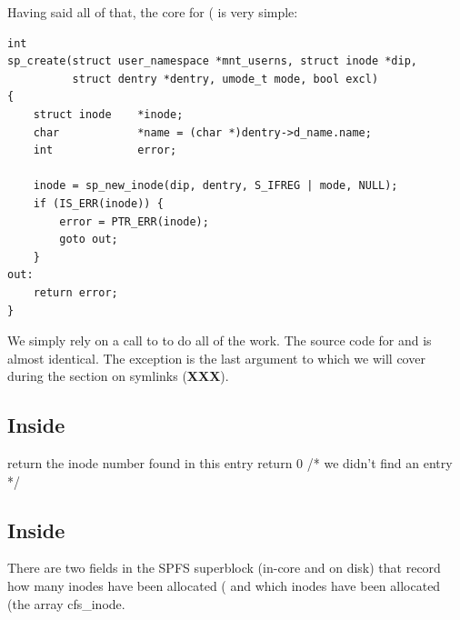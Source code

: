 \noindent
Having said all of that, the core for ( is very simple:

\begin{lstlisting}
int
sp_create(struct user_namespace *mnt_userns, struct inode *dip,
          struct dentry *dentry, umode_t mode, bool excl)
{ 
    struct inode    *inode;
    char            *name = (char *)dentry->d_name.name;
    int             error;
			
    inode = sp_new_inode(dip, dentry, S_IFREG | mode, NULL);
    if (IS_ERR(inode)) {
        error = PTR_ERR(inode);
        goto out;
    }
out:        
	return error;
}
\end{lstlisting}

\noindent
We simply rely on a call to  to do all of the work. The source code for  and  is almost identical. The exception is the last argument to  which we will cover during the section on symlinks (\textbf{XXX}).


\subsection{Inside }

\noindent
\begin{algorithmic}
\State return the inode number found in this entry
\EndIf
\EndFor
\EndFor
\State return 0 /* we didn't find an entry */
\end{algorithmic}


\subsection{Inside }

There are two fields in the SPFS superblock (in-core and on disk) that record how many inodes have been allocated ( and which inodes have been allocated (the array cf{s\_inode}. 

